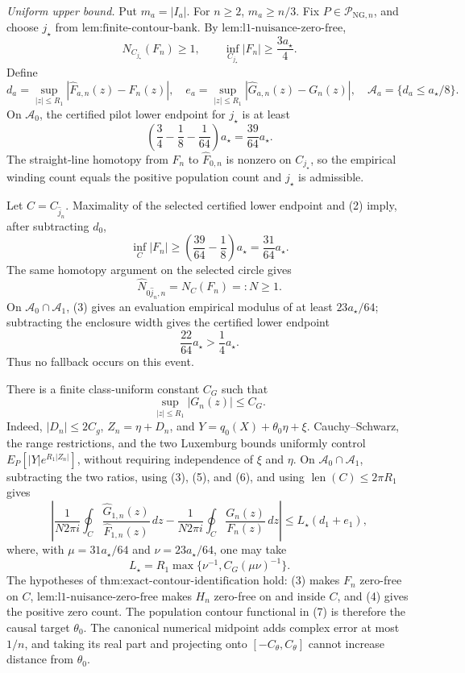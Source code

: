 \emph{Uniform upper bound.}  Put \(m_a=|I_a|\).  For \(n\ge2\), \(m_a\ge n/3\).  Fix \(P\in\mathcal P_{\mathrm{NG},n}\), and choose \(j_{\star}\) from \(\text{lem:finite-contour-bank}\).  By \(\text{lem:l1-nuisance-zero-free}\),
\[
 N_{C_{j_{\star}}}(F_n)\ge1,
 \qquad
 \inf_{C_{j_{\star}}}|F_n|
 \ge\frac{3a_{\star}}4. \tag{1}
\]
Define
\[
 d_a=\sup_{|z|\le R_1}|\widehat F_{a,n}(z)-F_n(z)|,
 \quad
 e_a=\sup_{|z|\le R_1}|\widehat G_{a,n}(z)-G_n(z)|,
 \quad
 \mathcal A_a=\{d_a\le a_{\star}/8\}.
\]
On \(\mathcal A_0\), the certified pilot lower endpoint for \(j_{\star}\) is at least
\[
 \left(\frac34-\frac18-\frac1{64}\right)a_{\star}
 =\frac{39}{64}a_{\star}. \tag{2}
\]
The straight-line homotopy from \(F_n\) to \(\widehat F_{0,n}\) is nonzero on \(C_{j_{\star}}\), so the empirical winding count equals the positive population count and \(j_{\star}\) is admissible.

Let \(C=C_{\widehat j_n}\).  Maximality of the selected certified lower endpoint and (2) imply, after subtracting \(d_0\),
\[
 \inf_C|F_n|
 \ge\left(\frac{39}{64}-\frac18\right)a_{\star}
 =\frac{31}{64}a_{\star}. \tag{3}
\]
The same homotopy argument on the selected circle gives
\[
 \widehat N_{0\widehat j_n,n}=N_C(F_n)=:N\ge1. \tag{4}
\]
On \(\mathcal A_0\cap\mathcal A_1\), (3) gives an evaluation empirical modulus of at least \(23a_{\star}/64\); subtracting the enclosure width gives the certified lower endpoint
\[
 \frac{22}{64}a_{\star}>\frac14a_{\star}. \tag{5}
\]
Thus no fallback occurs on this event.

There is a finite class-uniform constant \(C_G\) such that
\[
 \sup_{|z|\le R_1}|G_n(z)|\le C_G. \tag{6}
\]
Indeed, \(|D_n|\le2C_g\), \(Z_n=\eta+D_n\), and \(Y=q_0(X)+\theta_0\eta+\xi\).  Cauchy--Schwarz, the range restrictions, and the two Luxemburg bounds uniformly control \(E_P[|Y|e^{R_1|Z_n|}]\), without requiring independence of \(\xi\) and \(\eta\).  On \(\mathcal A_0\cap\mathcal A_1\), subtracting the two ratios, using (3), (5), and (6), and using \(\operatorname{len}(C)\le2\pi R_1\) gives
\[
 \left|
 \frac{1}{N2\pi i}\oint_C
 \frac{\widehat G_{1,n}(z)}{\widehat F_{1,n}(z)}\,dz
 -
 \frac{1}{N2\pi i}\oint_C
 \frac{G_n(z)}{F_n(z)}\,dz
 \right|
 \le L_{\star}(d_1+e_1), \tag{7}
\]
where, with \(\mu=31a_{\star}/64\) and \(\nu=23a_{\star}/64\), one may take
\[
 L_{\star}=R_1\max\{\nu^{-1},C_G(\mu\nu)^{-1}\}.
\]
The hypotheses of \(\text{thm:exact-contour-identification}\) hold: (3) makes \(F_n\) zero-free on \(C\), \(\text{lem:l1-nuisance-zero-free}\) makes \(H_n\) zero-free on and inside \(C\), and (4) gives the positive zero count.  The population contour functional in (7) is therefore the causal target \(\theta_0\).  The canonical numerical midpoint adds complex error at most \(1/n\), and taking its real part and projecting onto \([-C_{\theta},C_{\theta}]\) cannot increase distance from \(\theta_0\).

